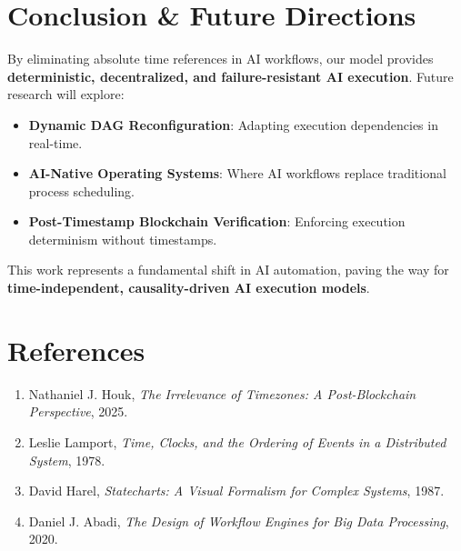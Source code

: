 \documentclass{article}
\begin{document}
\section{Conclusion \& Future Directions}
By eliminating absolute time references in AI workflows, our model provides \textbf{deterministic, decentralized, and failure-resistant AI execution}. Future research will explore:
\begin{itemize}
    \item \textbf{Dynamic DAG Reconfiguration}: Adapting execution dependencies in real-time.
    \item \textbf{AI-Native Operating Systems}: Where AI workflows replace traditional process scheduling.
    \item \textbf{Post-Timestamp Blockchain Verification}: Enforcing execution determinism without timestamps.
\end{itemize}

This work represents a fundamental shift in AI automation, paving the way for \textbf{time-independent, causality-driven AI execution models}.

\section*{References}
\begin{enumerate}
    \item Nathaniel J. Houk, \textit{The Irrelevance of Timezones: A Post-Blockchain Perspective}, 2025.
    \item Leslie Lamport, \textit{Time, Clocks, and the Ordering of Events in a Distributed System}, 1978.
    \item David Harel, \textit{Statecharts: A Visual Formalism for Complex Systems}, 1987.
    \item Daniel J. Abadi, \textit{The Design of Workflow Engines for Big Data Processing}, 2020.
\end{enumerate}
\end{document}
